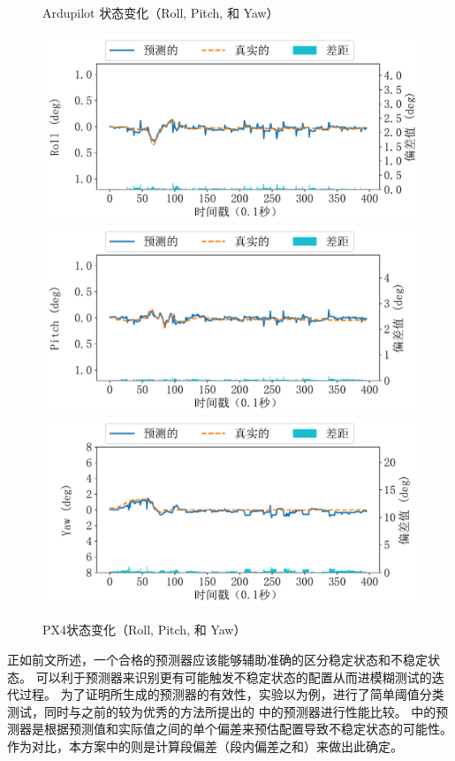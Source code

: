 \begin{figure}[htb]
\begin{minipage}{0.49\linewidth}
    \caption{Ardupilot 状态变化（Roll, Pitch, 和 Yaw）}
    \label{subfig:range_diff1}
\end{minipage}
\begin{minipage}{0.49\linewidth}
\includegraphics[width=\linewidth]{fig/range/px4_real_roll.pdf}\quad
\includegraphics[width=\linewidth]{fig/range/px4_real_pitch.pdf}\quad
\includegraphics[width=\linewidth]{fig/range/px4_real_yaw.pdf}
\caption{PX4状态变化（Roll, Pitch, 和 Yaw）}
\label{subfig:range_diff2}
\end{minipage}
\end{figure}

正如前文所述，一个合格的预测器应该能够辅助\icsearcher 准确的区分稳定状态和不稳定状态。
\icsearcher 可以利于预测器来识别更有可能触发不稳定状态的配置从而进模糊测试的迭代过程。
为了证明所生成的预测器的有效性，实验以为例，进行了简单阈值分类测试，同时与之前的较为优秀的方法所提出的 中的预测器进行性能比较。
 中的预测器是根据预测值和实际值之间的单个偏差来预估配置导致不稳定状态的可能性。
作为对比，本方案中的\icsearcher 则是计算段偏差（段内偏差之和）来做出此确定。


